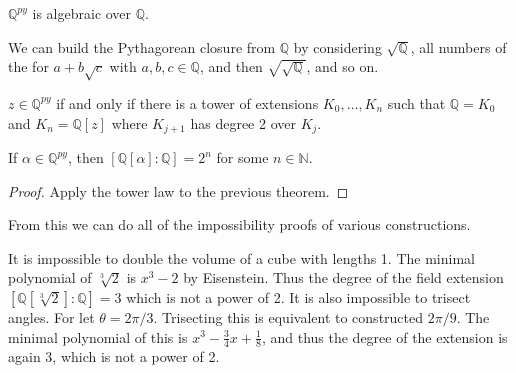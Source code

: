 \documentclass{article}                                                        %
\begin{document}
        \begin{theorem}
            $\mathbb{Q}^{py}$ is algebraic over $\mathbb{Q}$.
        \end{theorem}
        We can build the Pythagorean closure from $\mathbb{Q}$ by considering
        $\sqrt{\mathbb{Q}}$, all numbers of the for $a+b\sqrt{c}$ with
        $a,b,c\in\mathbb{Q}$, and then $\sqrt{\sqrt{\mathbb{Q}}}$, and so on.
        \begin{theorem}
            $z\in\mathbb{Q}^{py}$ if and only if there is a tower of extensions
            $K_{0},\dots,K_{n}$ such that $\mathbb{Q}=K_{0}$ and
            $K_{n}=\mathbb{Q}[z]$ where $K_{j+1}$ has degree 2 over $K_{j}$.
        \end{theorem}
        \begin{theorem}
            If $\alpha\in\mathbb{Q}^{py}$, then
            $[\mathbb{Q}[\alpha]:\mathbb{Q}]=2^{n}$ for some $n\in\mathbb{N}$.
        \end{theorem}
        \begin{proof}
            Apply the tower law to the previous theorem.
        \end{proof}
        From this we can do all of the impossibility proofs of various
        constructions.
        \begin{example}
            It is impossible to double the volume of a cube with lengths 1. The
            minimal polynomial of $\sqrt[3]{2}$ is $x^{3}-2$ by Eisenstein. Thus
            the degree of the field extension
            $[\mathbb{Q}[\sqrt[3]{2}]:\mathbb{Q}]=3$ which is not a power of 2.
            It is also impossible to trisect angles. For let $\theta=2\pi/3$.
            Trisecting this is equivalent to constructed $2\pi/9$. The minimal
            polynomial of this is $x^{3}-\frac{3}{4}x+\frac{1}{8}$, and thus
            the degree of the extension is again 3, which is not a power of 2.
        \end{example}
\end{document}
